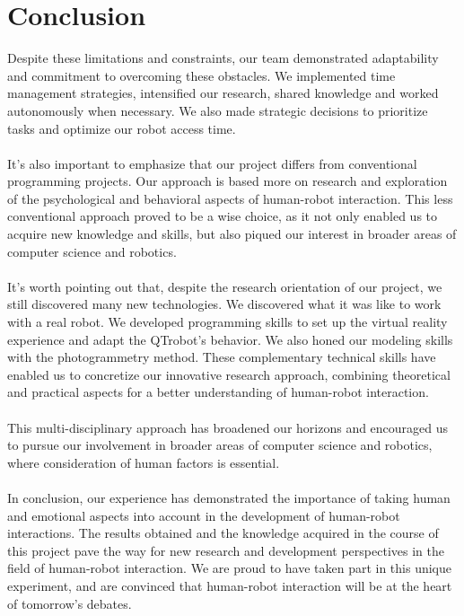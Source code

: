\chapter{Conclusion}

Despite these limitations and constraints, our team demonstrated adaptability and commitment to overcoming these obstacles. We implemented time management strategies, intensified our research, shared knowledge and worked autonomously when necessary. We also made strategic decisions to prioritize tasks and optimize our robot access time.\\
\\
It's also important to emphasize that our project differs from conventional programming projects. Our approach is based more on research and exploration of the psychological and behavioral aspects of human-robot interaction. This less conventional approach proved to be a wise choice, as it not only enabled us to acquire new knowledge and skills, but also piqued our interest in broader areas of computer science and robotics.\\
\\
It's worth pointing out that, despite the research orientation of our project, we still discovered many new technologies. We discovered what it was like to work with a real robot. We developed programming skills to set up the virtual reality experience and adapt the QTrobot's behavior. We also honed our modeling skills with the photogrammetry method. These complementary technical skills have enabled us to concretize our innovative research approach, combining theoretical and practical aspects for a better understanding of human-robot interaction.\\
\\
This multi-disciplinary approach has broadened our horizons and encouraged us to pursue our involvement in broader areas of computer science and robotics, where consideration of human factors is essential.\\
\\
In conclusion, our experience has demonstrated the importance of taking human and emotional aspects into account in the development of human-robot interactions. The results obtained and the knowledge acquired in the course of this project pave the way for new research and development perspectives in the field of human-robot interaction. We are proud to have taken part in this unique experiment, and are convinced that human-robot interaction will be at the heart of tomorrow's debates.